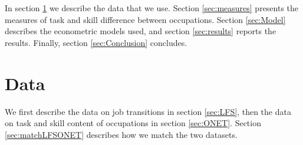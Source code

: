 \documentclass[12pt,authoryear]{elsarticle}
\begin{document}
	\vspace{2mm}
	
	
	In section \ref{sec:Data} we describe the data that we use. Section \ref{sec:measures} presents the measures of task and skill difference between occupations. Section \ref{sec:Model} describes the econometric models used, and section \ref{sec:results} reports the results. Finally, section \ref{sec:Conclusion} concludes.
	
	\section{Data}
	\label{sec:Data}
	We first describe the data on job transitions in section \ref{sec:LFS}, then the data on task and skill content of occupations in section \ref{sec:ONET}. Section \ref{sec:matchLFSONET} describes how we match the two datasets.
\end{document}
